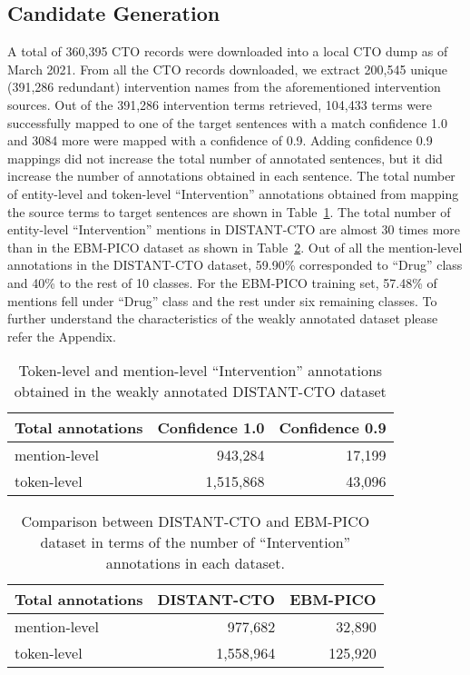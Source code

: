 \documentclass[letterpaper]{article} %
\begin{document}
\subsection{Candidate Generation}
\label{subsec:res_cand}
%
A total of 360,395 CTO records were downloaded into a local CTO dump as of March 2021.
From all the CTO records downloaded, we extract 200,545 unique (391,286 redundant) intervention names from the aforementioned intervention sources.
Out of the 391,286 intervention terms retrieved, 104,433 terms were successfully mapped to one of the target sentences with a match confidence 1.0 and 3084 more were mapped with a confidence of 0.9.
Adding confidence 0.9 mappings did not increase the total number of annotated sentences, but it did increase the number of annotations obtained in each sentence.
The total number of entity-level and token-level ``Intervention'' annotations obtained from mapping the source terms to target sentences are shown in Table~\ref{table:res_candgen}.
The total number of entity-level ``Intervention'' mentions in DISTANT-CTO are almost 30 times more than in the EBM-PICO dataset as shown in Table~\ref{table:candcomp}.
Out of all the mention-level annotations in the DISTANT-CTO dataset, 59.90\% corresponded to ``Drug'' class and 40\% to the rest of 10 classes.
For the EBM-PICO training set, 57.48\% of mentions fell under ``Drug'' class and the rest under six remaining classes.
To further understand the characteristics of the weakly annotated dataset please refer the Appendix.
%
%
\begin{table}[!htbp]
\centering
\begin{tabular}{lrr}
\hline \textbf{Total annotations} & \textbf{Confidence 1.0} & \textbf{Confidence 0.9} \\ \hline
mention-level & 943,284 & 17,199 \\
token-level & 1,515,868 & 43,096 \\
\hline
\end{tabular}
\caption{Token-level and mention-level ``Intervention'' annotations obtained in the weakly annotated DISTANT-CTO dataset}
\label{table:res_candgen} 
\end{table}
%
\begin{table}[!htbp]
\centering
\begin{tabular}{lrr}
\hline \textbf{Total annotations} & \textbf{DISTANT-CTO} & \textbf{EBM-PICO} \\ \hline
mention-level & 977,682 & 32,890\\
token-level & 1,558,964 & 125,920 \\
\hline
\end{tabular}
\caption{Comparison between DISTANT-CTO and EBM-PICO dataset in terms of the number of ``Intervention'' annotations in each dataset.}
\label{table:candcomp} 
\end{table}
\end{document}
